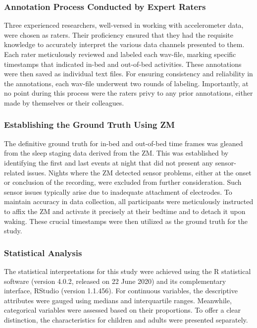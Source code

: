 \documentclass[
  9pt,
]{article}
\begin{document}
\hypertarget{annotation-process-conducted-by-expert-raters}{%
\subsubsection{Annotation Process Conducted by Expert
Raters}\label{annotation-process-conducted-by-expert-raters}}

Three experienced researchers, well-versed in working with accelerometer
data, were chosen as raters. Their proficiency ensured that they had the
requisite knowledge to accurately interpret the various data channels
presented to them. Each rater meticulously reviewed and labeled each
wav-file, marking specific timestamps that indicated in-bed and
out-of-bed activities. These annotations were then saved as individual
text files. For ensuring consistency and reliability in the annotations,
each wav-file underwent two rounds of labeling. Importantly, at no point
during this process were the raters privy to any prior annotations,
either made by themselves or their colleagues.

\hypertarget{establishing-the-ground-truth-using-zm}{%
\subsubsection{Establishing the Ground Truth Using
ZM}\label{establishing-the-ground-truth-using-zm}}

The definitive ground truth for in-bed and out-of-bed time frames was
gleaned from the sleep staging data derived from the ZM. This was
established by identifying the first and last events at night that did
not present any sensor-related issues. Nights where the ZM detected
sensor problems, either at the onset or conclusion of the recording,
were excluded from further consideration. Such sensor issues typically
arise due to inadequate attachment of electrodes. To maintain accuracy
in data collection, all participants were meticulously instructed to
affix the ZM and activate it precisely at their bedtime and to detach it
upon waking. These crucial timestamps were then utilized as the ground
truth for the study.

\hypertarget{statistical-analysis}{%
\subsubsection{Statistical Analysis}\label{statistical-analysis}}

The statistical interpretations for this study were achieved using the R
statistical software (version 4.0.2, released on 22 June 2020) and its
complementary interface, RStudio (version 1.1.456). For continuous
variables, the descriptive attributes were gauged using medians and
interquartile ranges. Meanwhile, categorical variables were assessed
based on their proportions. To offer a clear distinction, the
characteristics for children and adults were presented separately.
\end{document}
